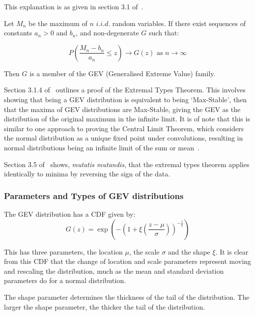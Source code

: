 This explanation is as given in section 3.1 of~\cite{Coles_2001}.

Let $M_n$ be the maximum of $n$ $i.i.d.$ random variables.
If there exist sequences of constants $a_n > 0$ and $b_n$, and non-degenerate $G$ such that:

\[ P\left( \frac{M_n - b_n}{a_n}  \leq z \right) \rightarrow G(z) \text{ as } n \rightarrow \infty \]

Then $G$ is a member of the GEV (Generalised Extreme Value) family.

Section 3.1.4  of~\cite{Coles_2001} outlines a proof of the Extremal Types Theorem.
This involves showing that being a GEV distribution is equivalent to being `Max-Stable',
    then that the maxima of GEV distributions are Max-Stable,
    giving the GEV as the distribution of the original maximum in the infinite limit.
It is of note that this is similar to one approach to proving the Central Limit Theorem,
    which considers the normal distribution as a unique fixed point under convolutions,
    resulting in normal distributions being an infinite limit of the sum or mean~\cite{Hamedani_Walter_1984}.

Section 3.5 of~\cite{Coles_2001} shows, \textit{mutatis mutandis},
    that the extremal types theorem applies identically to minima by reversing the sign of the data.

\subsubsection{Parameters and Types of GEV distributions}

The GEV distribution has a CDF given by:
\begin{equation}\label{eq:gevcdf}
    G(z) = \exp \left( - \left( 1 + \xi \left( \frac{z-\mu}{\sigma} \right)  \right)^{-\frac{1}{\xi}} \right)
\end{equation}

This has three parameters, the location $\mu$, the scale $\sigma$ and the shape $\xi$.
It is clear from this CDF that the change of location and scale parameters represent moving and rescaling the distribution,
    much as the mean and standard deviation parameters do for a normal distribution.

The shape parameter determines the thickness of the tail of the distribution.
The larger the shape parameter, the thicker the tail of the distribution.


